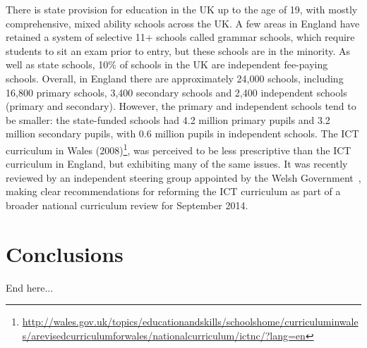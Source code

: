 \documentclass{sig-alternate}
\begin{document}
There is state provision for education in the UK up to the age of 19,
with mostly comprehensive, mixed ability schools across the UK. A few
areas in England have retained a system of selective 11+ schools
called grammar schools, which require students to sit an exam prior to
entry, but these schools are in the minority. As well as state
schools, 10\% of schools in the UK are independent fee-paying
schools. Overall, in England there are approximately 24,000 schools,
including 16,800 primary schools, 3,400 secondary schools and 2,400
independent schools (primary and secondary).  However, the primary and
independent schools tend to be smaller: the state-funded schools had
4.2 million primary pupils and 3.2 million secondary pupils, with 0.6
million pupils in independent schools. The ICT
curriculum in Wales
(2008)\footnote{\url{http://wales.gov.uk/topics/educationandskills/schoolshome/curriculuminwales/arevisedcurriculumforwales/nationalcurriculum/ictnc/?lang=en}},
was perceived to be less prescriptive than the ICT curriculum in
England, but exhibiting many of the same issues. It was recently
reviewed by an independent steering group appointed by the Welsh
Government~\cite{welshictreview:2013}, making clear recommendations for
reforming the ICT curriculum as part of a broader national curriculum
review for September 2014.

\section{Conclusions}
End here...




\end{document}
